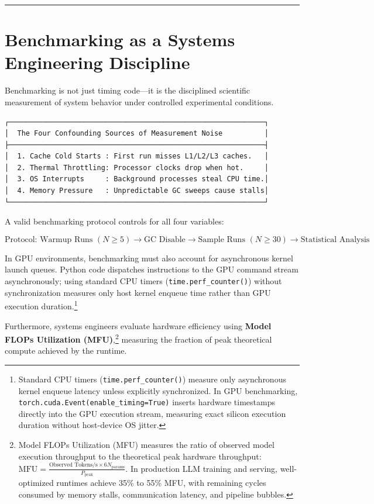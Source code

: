 \documentclass[
  letterpaper,
]{scrbook}
\begin{document}
\begin{center}\rule{0.5\linewidth}{0.5pt}\end{center}

\section{Benchmarking as a Systems Engineering
Discipline}\label{benchmarking-as-a-systems-engineering-discipline}

Benchmarking is not just timing code---it is the disciplined scientific
measurement of system behavior under controlled experimental conditions.

\begin{verbatim}
┌─────────────────────────────────────────────────────────────┐
│  The Four Confounding Sources of Measurement Noise          │
├─────────────────────────────────────────────────────────────┤
│  1. Cache Cold Starts : First run misses L1/L2/L3 caches.   │
│  2. Thermal Throttling: Processor clocks drop when hot.     │
│  3. OS Interrupts     : Background processes steal CPU time.│
│  4. Memory Pressure   : Unpredictable GC sweeps cause stalls│
└─────────────────────────────────────────────────────────────┘
\end{verbatim}

A valid benchmarking protocol controls for all four variables:

\[\text{Protocol: } \text{Warmup Runs } (N \ge 5) \longrightarrow \text{GC Disable} \longrightarrow \text{Sample Runs } (N \ge 30) \longrightarrow \text{Statistical Analysis}\]

In GPU environments, benchmarking must also account for asynchronous
kernel launch queues. Python code dispatches instructions to the GPU
command stream asynchronously; using standard CPU timers
(\texttt{time.perf\_counter()}) without synchronization measures only
host kernel enqueue time rather than GPU execution duration.\footnote{Standard
  CPU timers (\texttt{time.perf\_counter()}) measure only asynchronous
  kernel enqueue latency unless explicitly synchronized. In GPU
  benchmarking, \texttt{torch.cuda.Event(enable\_timing=True)} inserts
  hardware timestamps directly into the GPU execution stream, measuring
  exact silicon execution duration without host-device OS jitter.}

Furthermore, systems engineers evaluate hardware efficiency using
\textbf{Model FLOPs Utilization (MFU)},\footnote{Model FLOPs Utilization
  (MFU) measures the ratio of observed model execution throughput to the
  theoretical peak hardware throughput:
  \(\text{MFU} = \frac{\text{Observed Tokens/s} \times 6 N_{\text{params}}}{P_{\text{peak}}}\).
  In production LLM training and serving, well-optimized runtimes
  achieve 35\% to 55\% MFU, with remaining cycles consumed by memory
  stalls, communication latency, and pipeline bubbles.} measuring the
fraction of peak theoretical compute achieved by the runtime.
\end{document}
